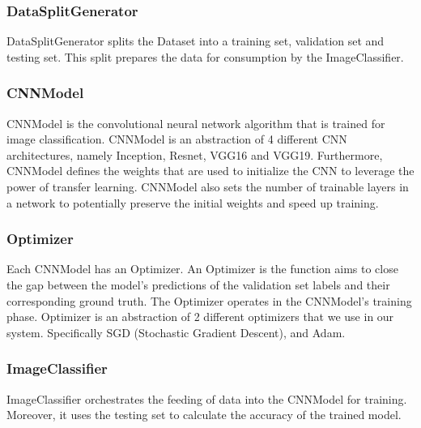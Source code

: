 \documentclass[a4paper,12pt,twoside]{report}
\begin{document}
\subsubsection{DataSplitGenerator}
DataSplitGenerator splits the Dataset into a training set, validation set and testing set. This split prepares the data for consumption by the ImageClassifier.

\subsubsection{CNNModel}
CNNModel is the convolutional neural network algorithm that is trained for image classification. CNNModel is an abstraction of 4 different CNN architectures, namely Inception, Resnet, VGG16 and VGG19. Furthermore, CNNModel defines the weights that are used to initialize the CNN to leverage the power of transfer learning. CNNModel also sets the number of trainable layers in a network to potentially preserve the initial weights and speed up training.

\subsubsection{Optimizer}
Each CNNModel has an Optimizer. An Optimizer is the function aims to close the gap between the model's predictions of the validation set labels and their corresponding ground truth. The Optimizer operates in the CNNModel's training phase. Optimizer is an abstraction of 2 different optimizers that we use in our system. Specifically SGD (Stochastic Gradient Descent), and Adam.

\subsubsection{ImageClassifier}
ImageClassifier orchestrates the feeding of data into the CNNModel for training. Moreover, it uses the testing set to calculate the accuracy of the trained model.
\end{document}

